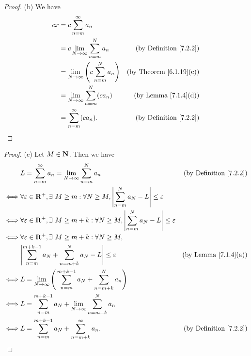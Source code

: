 \begin{proof}{(b)}
    We have
    \begin{align*}
        cx & = c \sum_{n = m}^\infty a_n                                                                  \\
           & = c \lim_{N \to \infty} \sum_{n = m}^N a_n             & \text{(by Definition \ref{7.2.2})}  \\
           & = \lim_{N \to \infty} \Bigg(c \sum_{n = m}^N a_n\Bigg) & \text{(by Theorem \ref{6.1.19}(c))} \\
           & = \lim_{N \to \infty} \sum_{n = m}^N (c a_n)           & \text{(by Lemma \ref{7.1.4}(d))}    \\
           & = \sum_{n = m}^\infty (c a_n).                         & \text{(by Definition \ref{7.2.2})}
    \end{align*}
\end{proof}

\begin{proof}{(c)}
    Let \(M \in \mathbf{N}\).
    Then we have
    \begin{align*}
             & L = \sum_{n = m}^\infty a_n = \lim_{N \to \infty} \sum_{n = m}^N a_n                                                  & \text{(by Definition \ref{7.2.2})} \\
        \iff & \forall \varepsilon \in \R^+, \exists\ M \geq m : \forall N \geq M, \abs{\sum_{n = m}^N a_N - L} \leq \varepsilon                                          \\
        \iff & \forall \varepsilon \in \R^+, \exists\ M \geq m + k : \forall N \geq M, \abs{\sum_{n = m}^N a_N - L} \leq \varepsilon                                      \\
        \iff & \forall \varepsilon \in \R^+, \exists\ M \geq m + k : \forall N \geq M,                                                                                    \\
             & \abs{\sum_{n = m}^{m + k - 1} a_N + \sum_{n = m + k}^N a_N - L} \leq \varepsilon                                      & \text{(by Lemma \ref{7.1.4}(a))}   \\
        \iff & L = \lim_{N \to \infty} \Bigg(\sum_{n = m}^{m + k - 1} a_N + \sum_{n = m + k}^N a_n\Bigg)                                                                  \\
        \iff & L = \sum_{n = m}^{m + k - 1} a_N + \lim_{N \to \infty} \sum_{n = m + k}^N a_n                                                                              \\
        \iff & L = \sum_{n = m}^{m + k - 1} a_N + \sum_{n = m + k}^\infty a_n.                                                       & \text{(by Definition \ref{7.2.2})}
    \end{align*}
\end{proof}


